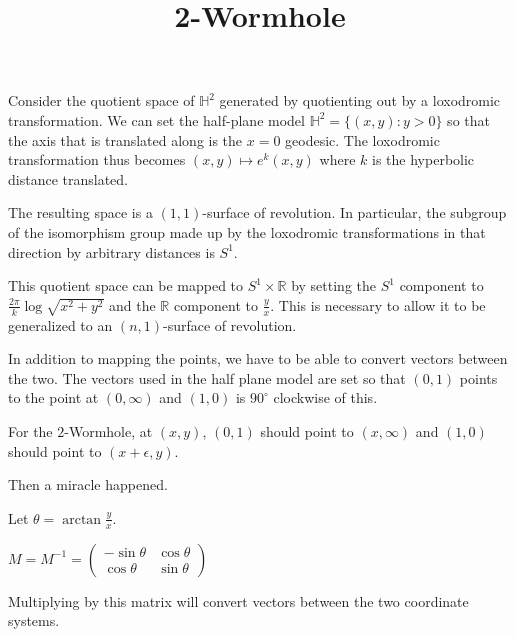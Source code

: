 \documentclass[12pt]{amsart}
\newcommand{\mat}[4]{\left(\begin{array}{ccc} #1 & #2 \\#3 & #4 \end{array} \right)}
\begin{document}
\title{2-Wormhole}
\maketitle

Consider the quotient space of $\mathbb{H}^2$ generated by quotienting out by a loxodromic transformation. We can set the half-plane model $\mathbb{H}^2 = \{(x,y):y>0\}$ so that the axis that is translated along is the $x=0$ geodesic. The loxodromic transformation thus becomes $(x,y) \mapsto e^k(x,y)$ where $k$ is the hyperbolic distance translated.

The resulting space is a $(1,1)$-surface of revolution. In particular, the subgroup of the isomorphism group made up by the loxodromic transformations in that direction by arbitrary distances is $S^1$.

This quotient space can be mapped to $S^1 \times \mathbb{R}$ by setting the $S^1$ component to $\frac{2\pi}{k}\log\sqrt{x^2+y^2}$ and the $\mathbb{R}$ component to $\frac{y}{x}$. This is necessary to allow it to be generalized to an $(n,1)$-surface of revolution.


In addition to mapping the points, we have to be able to convert vectors between the two. The vectors used in the half plane model are set so that $(0,1)$ points to the point at $(0,\infty)$ and $(1,0)$ is $90^\circ$ clockwise of this.

For the $2$-Wormhole, at $(x,y)$, $(0,1)$ should point to $(x,\infty)$ and $(1,0)$ should point to $(x+\epsilon,y)$.

Then a miracle happened.

Let $\theta = \arctan\frac{y}{x}$.

$M = M^{-1} = \mat{-\sin\theta}{\cos\theta}{\cos\theta}{\sin\theta}$

Multiplying by this matrix will convert vectors between the two coordinate systems.
\end{document}
